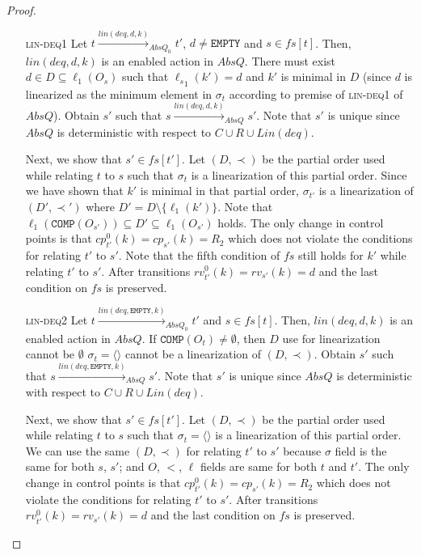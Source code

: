 \begin{proof}
\begin{itemize}
\item[\textsc{lin-deq1}] Let $t \xrightarrow{lin(deq,d,k)}_{AbsQ_0} t'$, $d \neq \texttt{EMPTY}$ and $s \in fs[t]$. Then, $lin(deq,d,k)$ is an enabled action in $AbsQ$. There must exist $d \in D \subseteq \ell_1(O_s)$ such that ${\ell_s}_1(k') = d$ and $k'$ is minimal in $D$ (since $d$ is linearized as the minimum element in $\sigma_t$ according to premise of \textsc{lin-deq1} of $AbsQ$). Obtain $s'$ such that $s \xrightarrow{lin(deq,d,k)}_{AbsQ} s'$. Note that $s'$ is unique since $AbsQ$ is deterministic with respect to $C \cup R \cup Lin(deq)$. 

Next, we show that $s' \in fs[t']$. Let $(D, \prec)$ be the partial order used while relating $t$ to $s$ such that $\sigma_t$ is a linearization of this partial order. Since we have shown that $k'$ is minimal in that partial order, $\sigma_{t'}$ is a linearization of $(D', \prec')$ where $D' = D \setminus \{\ell_1(k')\}$. Note that $\ell_1(\texttt{COMP}(O_{s'})) \subseteq D' \subseteq \ell_1(O_{s'})$ holds. The only change in control points is that $cp^0_{t'}(k) = cp_{s'}(k) = R_2$ which does not violate the conditions for relating $t'$ to $s'$. Note that the fifth condition of $fs$ still holds for $k'$ while relating $t'$ to $s'$. After transitions $rv^0_{t'}(k) = rv_{s'}(k) = d$ and the last condition on $fs$ is preserved.

\item[\textsc{lin-deq2}] Let $t \xrightarrow{lin(deq,\texttt{EMPTY},k)}_{AbsQ_0} t'$ and $s \in fs[t]$. Then, $lin(deq,d,k)$ is an enabled action in $AbsQ$. If $\texttt{COMP}(O_t) \neq \emptyset$, then $D$ use for linearization cannot be $\emptyset$ $\sigma_t = \langle\rangle$ cannot be a linearization of $(D, \prec)$. Obtain $s'$ such that $s \xrightarrow{lin(deq,\texttt{EMPTY},k)}_{AbsQ} s'$. Note that $s'$ is unique since $AbsQ$ is deterministic with respect to $C \cup R \cup Lin(deq)$. 

Next, we show that $s' \in fs[t']$. Let $(D, \prec)$ be the partial order used while relating $t$ to $s$ such that $\sigma_t = \langle \rangle $ is a linearization of this partial order. We can use the same $(D, \prec)$ for relating $t'$ to $s'$ because $\sigma$ field is the same for both $s$, $s'$; and $O$, $<$, $\ell$ fields are same for both $t$ and $t'$. The only change in control points is that $cp^0_{t'}(k) = cp_{s'}(k) = R_2$ which does not violate the conditions for relating $t'$ to $s'$.  After transitions $rv^0_{t'}(k) = rv_{s'}(k) = d$ and the last condition on $fs$ is preserved.


\end{itemize}
\end{proof}
